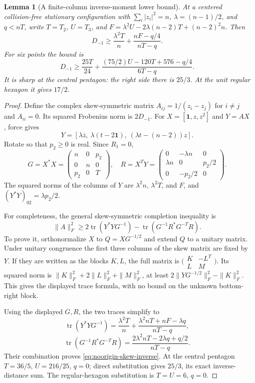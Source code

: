 \documentclass[11pt]{article}
\newtheorem{lemma}[theorem]{Lemma}
\theoremstyle{remark}
\numberwithin{equation}{section}
\begin{document}
\begin{lemma}[A finite-column inverse-moment lower bound]
\label{lem:noorigin-skew-inverse}
At a centered collision-free stationary configuration with
$\sum_i|z_i|^2=n$, $\lambda=(n-1)/2$, and $q<nT$, write
$T=T_2$, $U=T_3$, and
$F=\lambda^2U-2\lambda(n-2)T+(n-2)^2n$. Then
\begin{equation}\label{eq:noorigin-skew-inverse}
 D_{-1}\ge\frac{\lambda^2T}{n}+
                          \frac{nF-q/4}{nT-q}.
\end{equation}
For six points the bound is
\[
 D_{-1}\ge\frac{25T}{24}
       +\frac{(75/2)U-120T+576-q/4}{6T-q}.
\]
It is sharp at the central pentagon: the right side there is $25/3$.
At the unit regular hexagon it gives $17/2$.
\end{lemma}
\begin{proof}
Define the complex skew-symmetric matrix
$A_{ij}=1/(z_i-z_j)$ for $i\ne j$ and $A_{ii}=0$.
Its squared Frobenius norm is $2D_{-1}$.
For $X=[\mathbf1,z,z^2]$ and $Y=AX$, force gives
\[
 Y=[\lambda\overline z,\ \lambda(t-2\mathbf1),\
                             (\lambda t-(n-2))z].
\]
Rotate so that $p_2\ge0$ is real. Since $R_1=0$,
\[
 G=X^*X=\begin{pmatrix}n&0&p_2\\0&n&0\\p_2&0&T\end{pmatrix},
 \quad
 R=X^TY=\begin{pmatrix}0&-\lambda n&0\\
             \lambda n&0&p_2/2\\0&-p_2/2&0\end{pmatrix}.
\]
The squared norms of the columns of $Y$ are
$\lambda^2n$, $\lambda^2T$, and $F$, and
$(Y^*Y)_{02}=\lambda p_2/2$.

For completeness, the general skew-symmetric completion inequality
is
\[
 \|A\|_F^2\ge
 2\operatorname{tr}(Y^*YG^{-1})
 -\operatorname{tr}(G^{-1}R^*G^{-T}R).
\]
To prove it, orthonormalize $X$ to $Q=XG^{-1/2}$ and extend $Q$
to a unitary matrix. Under unitary congruence the first three columns
of the skew matrix are fixed by $Y$. If they are written as the
blocks $K,L$, the full matrix is
$\bigl(\begin{smallmatrix}K&-L^T\\L&M\end{smallmatrix}\bigr)$.
Its squared norm is $\|K\|_F^2+2\|L\|_F^2+\|M\|_F^2$,
at least $2\|Y G^{-1/2}\|_F^2-\|K\|_F^2$.
This gives the displayed trace formula, with no bound on the
unknown bottom-right block.

Using the displayed $G,R$, the two traces simplify to
\[
 \operatorname{tr}(Y^*YG^{-1})
 =\frac{\lambda^2T}{n}
       +\frac{\lambda^2nT+nF-\lambda q}{nT-q},
\]
\[
 \operatorname{tr}(G^{-1}R^*G^{-T}R)
       =\frac{2\lambda^2nT-2\lambda q+q/2}{nT-q}.
\]
Their combination proves \eqref{eq:noorigin-skew-inverse}.
At the central pentagon $T=36/5$, $U=216/25$, $q=0$;
direct substitution gives $25/3$, its exact inverse-distance sum.
The regular-hexagon substitution is $T=U=6$, $q=0$.
\end{proof}
\end{document}

